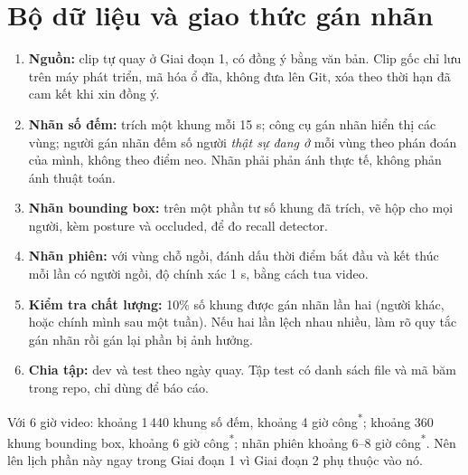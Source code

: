 \documentclass[10pt,a4paper,oneside,openany]{report}
\newcommand{\breakus}{\textunderscore\allowbreak}
\newcommand{\code}[1]{{\ttfamily\let\_\breakus #1}}
\newcommand{\uoc}{\textsuperscript{\textcolor{warn}{*}}}  %
\begin{document}
\section{Bộ dữ liệu và giao thức gán nhãn}\label{sec:dulieu}
\begin{enumerate}
  \item \textbf{Nguồn:} clip tự quay ở Giai đoạn 1, có đồng ý bằng văn bản. Clip gốc chỉ lưu trên máy phát triển, mã hóa ổ đĩa, không đưa lên Git,
        xóa theo thời hạn đã cam kết khi xin đồng ý.
  \item \textbf{Nhãn số đếm:} trích một khung mỗi 15 s; công cụ gán nhãn hiển thị các vùng; người gán nhãn đếm số người \emph{thật sự đang ở} mỗi vùng
        theo phán đoán của mình, không theo điểm neo. Nhãn phải phản ánh thực tế, không phản ánh thuật toán.
  \item \textbf{Nhãn bounding box:} trên một phần tư số khung đã trích, vẽ hộp cho mọi người, kèm \code{posture} và \code{occluded}, để đo recall detector.
  \item \textbf{Nhãn phiên:} với vùng chỗ ngồi, đánh dấu thời điểm bắt đầu và kết thúc mỗi lần có người ngồi, độ chính xác 1 s, bằng cách tua video.
  \item \textbf{Kiểm tra chất lượng:} 10\% số khung được gán nhãn lần hai (người khác, hoặc chính mình sau một tuần). Nếu hai lần lệch nhau nhiều,
        làm rõ quy tắc gán nhãn rồi gán lại phần bị ảnh hưởng.
  \item \textbf{Chia tập:} dev và test theo ngày quay. Tập test có danh sách file và mã băm trong repo, chỉ dùng để báo cáo.
\end{enumerate}
\begin{luuy}
Với 6 giờ video: khoảng 1\,440 khung số đếm, khoảng 4 giờ công\uoc; khoảng 360 khung bounding box, khoảng 6 giờ công\uoc;
nhãn phiên khoảng 6--8 giờ công\uoc. Nên lên lịch phần này ngay trong Giai đoạn 1 vì Giai đoạn 2 phụ thuộc vào nó.
\end{luuy}
\end{document}
